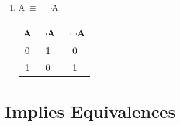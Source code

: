 \documentclass{report}
\begin{document}
\begin{enumerate}



  \item A $\equiv$ $\neg$$\neg$A



\begin{center}

  \begin{tabular}{| c | c | c |}

    \hline

    A & $\neg$A & $\neg$$\neg$A \\ \hline

    0 & 1 & 0 \\

    1 & 0 & 1 \\ \hline

  \end{tabular}

\end{center}



\end{enumerate}



\section{Implies Equivalences}
\end{document}
